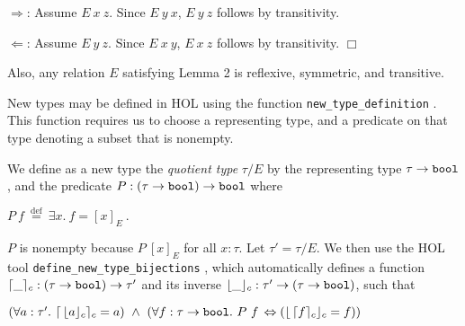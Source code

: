 \documentclass[envcountsame,runningheads]{llncs}
\def\defeq{\stackrel{\mathrm{def}}{=}}
\begin{document}
{\addtolength{\parindent}{\parindent}
$\Rightarrow$:
Assume $E\ x\ z$.
Since $E\ y\ x$,
$E\ y\ z$ follows by transitivity.

$\Leftarrow$:
Assume $E\ y\ z$.
Since $E\ x\ y$, $E\ x\ z$ follows
by transitivity.
$\Box$
}

\vspace{\topsep}
\noindent
Also, any relation $E$ satisfying Lemma 2 is reflexive,
symmetric, and transitive.

New types may be defined in HOL
using the function {\tt new\_type\_definition}
\cite[sections 18.2.2.3-5]{GoMe93}.
This function requires us to
choose a representing
type, and a predicate on that type denoting a subset that is nonempty.

We define as a new type the
{\it quotient type\/} $\tau / E$
by the representing type $\tau \rightarrow \mbox{\tt bool}$, and the
predicate $P : (\tau \rightarrow \mbox{\tt bool}) \rightarrow \mbox{\tt bool}$
where
\begin{definition}
\label{p_def}
$
P \ f  \ \defeq \  \exists x.\ f = [ x ]_E \ .
$
\end{definition}

\noindent
$P$ is nonempty because $P \ [ x ]_E$ for all $x : \tau$.
Let $\tau' = \tau / E$.
We then use the HOL tool
{\tt define\_new\_type\_bijections}
\cite{GoMe93}, which automatically defines
a function
$\lceil \_ \rceil_c
: (\tau \rightarrow \mbox{\tt bool}) \rightarrow  \tau'$
and its inverse
$\lfloor \_ \rfloor_c
: \tau' \rightarrow (\tau \rightarrow \mbox{\tt bool}) $, such that

\begin{theorem}
\label{abs_rep_classes}
$
(\forall a:\tau'.\ \lceil \, \lfloor a \rfloor_c \rceil_c = a)
\ \wedge \ 
(\forall f:\tau \rightarrow \mbox{\tt bool}.\ 
P\ f \, \Leftrightarrow (\lfloor \, \lceil f \rceil_c \rfloor_c = f)) 
$
\end{theorem}
\end{document}
